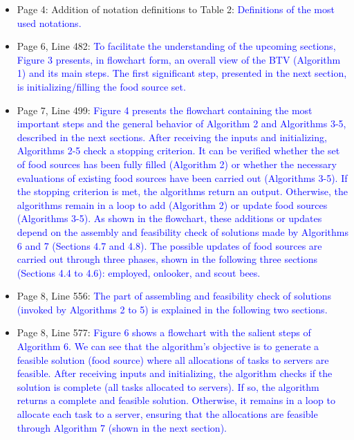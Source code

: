 \begin{itemize}
    \item Page 4: Addition of notation definitions to Table 2: \textcolor{blue}{Definitions of the most used notations.}
    \item Page 6, Line 482: \textcolor{blue}{To facilitate the understanding of the upcoming sections, Figure 3 presents, in flowchart form, an overall view of the BTV (Algorithm 1) and its main steps. The first significant step, presented in the next section, is initializing/filling the food source set.}
    \item Page 7, Line 499: \textcolor{blue}{Figure 4 presents the flowchart containing the most important steps and the general behavior of Algorithm 2 and Algorithms 3-5, described in the next sections. After receiving the inputs and initializing, Algorithms 2-5 check a stopping criterion. It can be verified whether the set of food sources has been fully filled (Algorithm 2) or whether the necessary evaluations of existing food sources have been carried out (Algorithms 3-5). If the stopping criterion is met, the algorithms return an output. Otherwise, the algorithms remain in a loop to add (Algorithm 2) or update food sources (Algorithms 3-5). As shown in the flowchart, these additions or updates depend on the assembly and feasibility check of solutions made by Algorithms 6 and 7 (Sections 4.7 and 4.8). The possible updates of food sources are carried out through three phases, shown in the following three sections (Sections 4.4 to 4.6): employed, onlooker, and scout bees.}
    \item Page 8, Line 556: \textcolor{blue}{The part of assembling and feasibility check of solutions (invoked by Algorithms 2 to 5) is explained in the following two sections.}
    \item Page 8, Line 577: \textcolor{blue}{Figure 6 shows a flowchart with the salient steps of Algorithm 6. We can see that the algorithm's objective is to generate a feasible solution (food source) where all allocations of tasks to servers are feasible. After receiving inputs and initializing, the algorithm checks if the solution is complete (all tasks allocated to servers). If so, the algorithm returns a complete and feasible solution. Otherwise, it remains in a loop to allocate each task to a server, ensuring that the allocations are feasible through Algorithm 7 (shown in the next section).}    
\end{itemize}

\vspace{\baselineskip}


